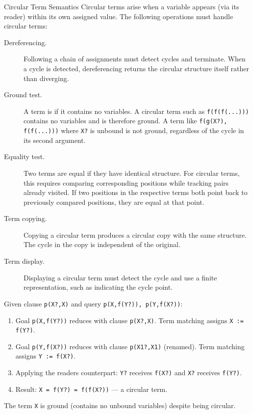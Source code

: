 \begin{formal}{Circular Term Semantics}
\label{formal:circular-terms}
Circular terms arise when a variable appears (via its reader) within its own assigned value. The following operations must handle circular terms:

\begin{description}
\item[Dereferencing.] Following a chain of assignments must detect cycles and terminate. When a cycle is detected, dereferencing returns the circular structure itself rather than diverging.

\item[Ground test.] A term is  if it contains no variables. A circular term such as \verb|f(f(f(...)))| contains no variables and is therefore ground. A term like \verb|f(g(X?), f(f(...)))| where \verb|X?| is unbound is not ground, regardless of the cycle in its second argument.

\item[Equality test.] Two terms are equal if they have identical structure. For circular terms, this requires comparing corresponding positions while tracking pairs already visited. If two positions in the respective terms both point back to previously compared positions, they are equal at that point.

\item[Term copying.] Copying a circular term produces a circular copy with the same structure. The cycle in the copy is independent of the original.

\item[Term display.] Displaying a circular term must detect the cycle and use a finite representation, such as indicating the cycle point.
\end{description}
\end{formal}

\begin{example}
\label{example:circular-term}
Given clause \verb|p(X?,X)| and query \verb|p(X,f(Y?)), p(Y,f(X?))|:
\begin{enumerate}
\item Goal \verb|p(X,f(Y?))| reduces with clause \verb|p(X?,X)|. Term matching assigns \verb|X := f(Y?)|.
\item Goal \verb|p(Y,f(X?))| reduces with clause \verb|p(X1?,X1)| (renamed). Term matching assigns \verb|Y := f(X?)|.
\item Applying the readers counterpart: \verb|Y?| receives \verb|f(X?)| and \verb|X?| receives \verb|f(Y?)|.
\item Result: \verb|X = f(Y?) = f(f(X?))| --- a circular term.
\end{enumerate}
The term \verb|X| is ground (contains no unbound variables) despite being circular.
\end{example}


